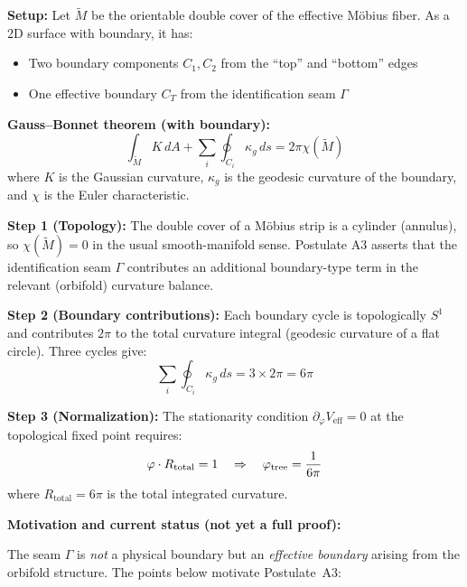 \begin{tcolorbox}[colback=green!3, colframe=green!50!black, 
    title={\textbf{Proof Sketch for $\phitree = 1/(6\pi)$ (with Postulate A3)}}, fonttitle=\bfseries\small]
\textbf{Setup:} Let $\widetilde{M}$ be the orientable double cover of the effective 
M\"obius fiber. As a 2D surface with boundary, it has:
\begin{itemize}[leftmargin=1.5em, topsep=2pt, itemsep=1pt]
    \item Two boundary components $C_1, C_2$ from the ``top'' and ``bottom'' edges
    \item One effective boundary $C_T$ from the identification seam $\Gamma$
\end{itemize}

\textbf{Gauss--Bonnet theorem (with boundary):}
\begin{equation}
    \int_{\widetilde{M}} K\, dA + \sum_i \oint_{C_i} \kappa_g\, ds = 2\pi\chi(\widetilde{M})
\end{equation}
where $K$ is the Gaussian curvature, $\kappa_g$ is the geodesic curvature of the boundary, 
and $\chi$ is the Euler characteristic.

\textbf{Step 1 (Topology):} The double cover of a M\"obius strip is a cylinder (annulus), 
so $\chi(\widetilde{M}) = 0$ in the usual smooth-manifold sense. Postulate A3 asserts that the 
identification seam $\Gamma$ contributes an additional boundary-type term in the relevant (orbifold) 
curvature balance.

\textbf{Step 2 (Boundary contributions):} Each boundary cycle is topologically $S^1$ and 
contributes $2\pi$ to the total curvature integral (geodesic curvature of a flat circle). 
Three cycles give:
\begin{equation}
    \sum_i \oint_{C_i} \kappa_g\, ds = 3 \times 2\pi = 6\pi
\end{equation}

\textbf{Step 3 (Normalization):} The stationarity condition $\partial_\varphi V_{\text{eff}} = 0$ 
at the topological fixed point requires:
\begin{equation}
    \varphi \cdot R_{\text{total}} = 1 \quad\Rightarrow\quad \varphi_{\mathrm{tree}} = \frac{1}{6\pi}
\end{equation}
where $R_{\text{total}} = 6\pi$ is the total integrated curvature.

\textbf{Motivation and current status (not yet a full proof):}

The seam $\Gamma$ is \emph{not} a physical boundary but an \emph{effective boundary} arising 
from the orbifold structure. The points below motivate Postulate~A3:


\end{tcolorbox}
